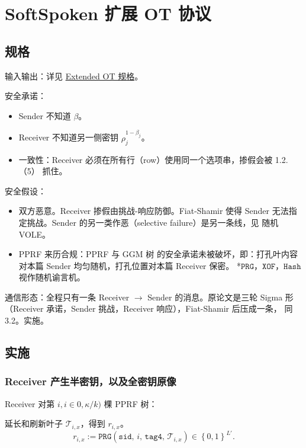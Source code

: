 \section{SoftSpoken 扩展 OT 协议}
\subsection{规格}

输入输出：详见 \hyperref[sec:softspoken:spec]{Extended OT 规格}。

安全承诺：

\begin{itemize}

\item
  Sender 不知道 $\beta$。
\item
  Receiver 不知道另一侧密钥 $\rho^{1-\beta_j}_j$。
\item
  一致性：Receiver 必须在所有行（row）使用同一个选项串，掺假会被 1.2.（5）
  抓住。
\end{itemize}

安全假设：

\begin{itemize}

\item
  双方恶意。Receiver 掺假由挑战-响应防御。Fiat-Shamir 使得 Sender
  无法指定挑战。Sender 的另一类作恶（selective failure）是另一条线，见
  随机 VOLE。
\item
  PPRF 来历合规：PPRF 与 GGM 树 的安全承诺未被破坏，即：打孔叶内容对本篇
  Sender 均匀随机，打孔位置对本篇 Receiver 保密。
  *$\mathtt{PRG}$，$\mathtt{XOF}$，$\mathtt{Hash}$ 视作随机谕言机。
\end{itemize}

通信形态：全程只有一条 Receiver $\to$ Sender 的消息。原论文是三轮 Sigma
形（Receiver 承诺，Sender 挑战，Receiver 响应），Fiat-Shamir 后压成一条，
同 3.2。实施。

\subsection{实施}
\subsubsection{Receiver 产生半密钥，以及全密钥原像}

Receiver 对第 $i, i \in 0, \kappa/k)$ 棵 PPRF 树：

延长和刷新叶子 $\mathcal{T}_{i, x}$，得到 $r_{i,x}$。
\begin{equation}\label{eq:05-softspoken:leaf}
r_{i,x} := \mathtt{PRG}\left(\mathtt{sid},\, i,\, \mathtt{tag4},\, \mathcal{T}_{i,x}\right) \in \left\{0,1\right\}^{L'}. \tag{leaf}
\end{equation}

